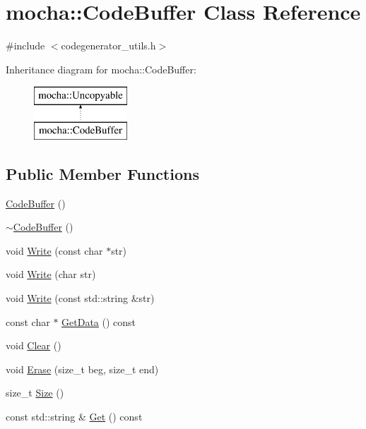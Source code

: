 \hypertarget{classmocha_1_1_code_buffer}{
\section{mocha::CodeBuffer Class Reference}
\label{classmocha_1_1_code_buffer}
}


{\ttfamily \#include $<$codegenerator\_\-utils.h$>$}

Inheritance diagram for mocha::CodeBuffer:\begin{figure}[H]
\begin{center}
\leavevmode
\includegraphics[height=2.000000cm]{classmocha_1_1_code_buffer}
\end{center}
\end{figure}
\subsection*{Public Member Functions}
\begin{DoxyCompactItemize}
\item 
\hyperlink{classmocha_1_1_code_buffer_ac717ce28d15ce963ce2c1b2aa13ea851}{CodeBuffer} ()
\item 
\hyperlink{classmocha_1_1_code_buffer_a446eda5b31687f26d54e79cb5edc52f0}{$\sim$CodeBuffer} ()
\item 
void \hyperlink{classmocha_1_1_code_buffer_acf0b19f0ed536ca22922f4af17ec5e69}{Write} (const char $\ast$str)
\item 
void \hyperlink{classmocha_1_1_code_buffer_a758503ee1ec29946036cf3eb517b7b14}{Write} (char str)
\item 
void \hyperlink{classmocha_1_1_code_buffer_add5a0f01a5006f49f47df960e0f85fbc}{Write} (const std::string \&str)
\item 
const char $\ast$ \hyperlink{classmocha_1_1_code_buffer_a9632dcb2f40212ce216962be8f82a450}{GetData} () const 
\item 
void \hyperlink{classmocha_1_1_code_buffer_ad81ef6b61cbadda42b2646c60101c169}{Clear} ()
\item 
void \hyperlink{classmocha_1_1_code_buffer_a2404ee297df0b914eb805dde38287c67}{Erase} (size\_\-t beg, size\_\-t end)
\item 
size\_\-t \hyperlink{classmocha_1_1_code_buffer_ae451d2baccb67df1d26a5af418bb35f6}{Size} ()
\item 
const std::string \& \hyperlink{classmocha_1_1_code_buffer_a079468ec1c722202d4ec129adf4122c4}{Get} () const 
\end{DoxyCompactItemize}

